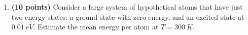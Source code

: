 \documentclass[fleqn]{article}
\begin{document}
\begin{enumerate}
      \textcolor{hwColor}{
        \\
      }

    \item \textbf{(10 points)} Consider a large system of hypothetical atoms that have just two energy states: a
    ground state with zero energy, and an excited state at $0.01 ~ eV$. Estimate the mean energy per
    atom at $T=300 ~ K$.

      \textcolor{hwColor}{
        \\
      }

  \end{enumerate}
\end{document}

